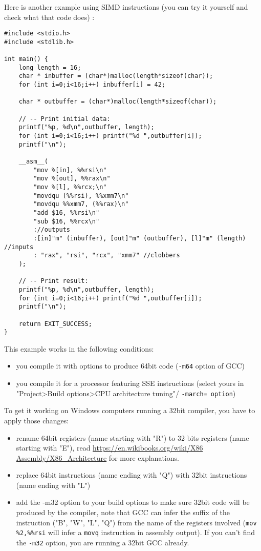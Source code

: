 \documentclass{article}
\begin{document}
Here is another example using SIMD instructions
(you can try it yourself and check what that code does) :
\begin{verbatim}
#include <stdio.h>
#include <stdlib.h>

int main() {
    long length = 16;
    char * inbuffer = (char*)malloc(length*sizeof(char));
    for (int i=0;i<16;i++) inbuffer[i] = 42;
    
    char * outbuffer = (char*)malloc(length*sizeof(char));
    
    // -- Print initial data:
    printf("%p, %d\n",outbuffer, length);
    for (int i=0;i<16;i++) printf("%d ",outbuffer[i]);
    printf("\n");

    __asm__(
        "mov %[in], %%rsi\n"
        "mov %[out], %%rax\n"
        "mov %[l], %%rcx;\n"
        "movdqu (%%rsi), %%xmm7\n"
        "movdqu %%xmm7, (%%rax)\n"
        "add $16, %%rsi\n"
        "sub $16, %%rcx\n"
        ://outputs
        :[in]"m" (inbuffer), [out]"m" (outbuffer), [l]"m" (length) //inputs
        : "rax", "rsi", "rcx", "xmm7" //clobbers
    );

    // -- Print result:
    printf("%p, %d\n",outbuffer, length);
    for (int i=0;i<16;i++) printf("%d ",outbuffer[i]);
    printf("\n");

    return EXIT_SUCCESS;
}
\end{verbatim}


This example works in the following conditions:
\begin{itemize}
    \item you compile it with options to produce 64bit code (\verb+-m64+ option of GCC)
    \item you compile it for a processor featuring SSE instructions (select yours in "Project>Build
options>CPU architecture tuning"/ \verb+-march= option+)
\end{itemize}

To get it working on Windows computers running a 32bit compiler, you have to apply those changes:
\begin{itemize}
    \item rename 64bit registers (name starting with "R") to 32 bits registers (name starting with
"E"), read \url{https://en.wikibooks.org/wiki/X86 Assembly/X86_Architecture} for more explanations.
    \item replace 64bit instructions (name ending with "Q") with 32bit instructions (name ending with
"L")
    \item add the -m32 option to your build options to make sure 32bit code will be produced by the
compiler, note that GCC can infer the suffix of the instruction ("B", "W", "L", "Q") from
the name of the registers involved (\verb+mov %2,%%rsi+ will infer a \verb+movq+ instruction in assembly
output). If you can’t find the \verb+-m32+ option, you are running a 32bit GCC already.
\end{itemize}
\end{document}

